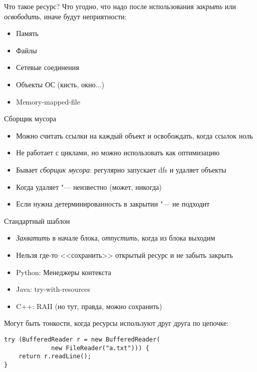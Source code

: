 \begin{frame}[t]{Что такое ресурс?}
	Что угодно, что надо после использования \textit{закрыть} или \textit{освободить},
	иначе будут неприятности:

	\begin{itemize}
	\item Память
	\item Файлы
	\item Сетевые соединения
	\item Объекты ОС (кисть, окно...)
	\item Memory-mapped-file
	\end{itemize}
\end{frame}

\begin{frame}[t]{Сборщик мусора}
	\begin{itemize}
	\item Можно считать ссылки на каждый объект и освобождать, когда ссылок ноль
	\item Не работает с циклами, но можно использовать как оптимизацию
	\item Бывает \textit{сборщик мусора}: регулярно запускает dfs и удаляет объекты
	\item Когда удаляет "--- неизвестно (может, никогда)
	\item Если нужна детерминированность в закрытии "--- не подходит
	\end{itemize}
\end{frame}

\begin{frame}[t,fragile]{Стандартный шаблон}
	\begin{itemize}
		\item \textit{Захватить} в начале блока, \textit{отпустить}, когда из блока выходим
		\item Нельзя где-то <<сохранить>> открытый ресурс и не забыть закрыть
		\item Python: Менеджеры контекста
		\item Java: try-with-resources
		\item C++: RAII (но тут, правда, можно сохранить)
	\end{itemize}
	Могут быть тонкости, когда ресурсы используют друг друга по цепочке:
\begin{verbatim}
try (BufferedReader r = new BufferedReader(
             new FileReader("a.txt"))) {
    return r.readLine();
}
\end{verbatim}
\end{frame}
